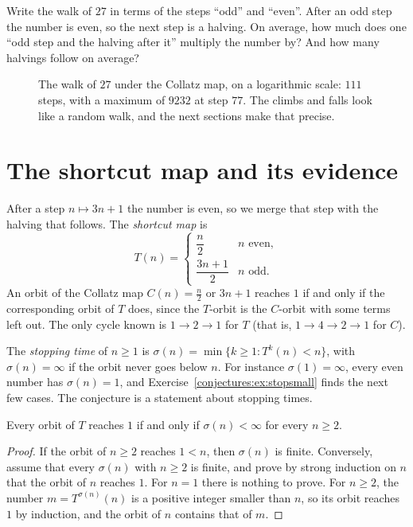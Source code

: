 \begin{think}
Write the walk of $27$ in terms of the steps ``odd'' and ``even''. After an odd step the number is even, so the next step is a halving. On average,
how much does one ``odd step and the halving after it'' multiply the number by? And how many halvings follow on average?
\end{think}

\begin{figure}[ht]
\centering
{}
\caption{The walk of $27$ under the Collatz map, on a logarithmic scale: $111$ steps, with a maximum of $9232$ at step $77$. The climbs and falls
look like a random walk, and the next sections make that precise.}
\label{conjectures:fig:traj27}
\end{figure}

\section{The shortcut map and its evidence}

After a step $n\mapsto3n+1$ the number is even, so we merge that step with the halving that follows. The \emph{shortcut map} is
\[
T(n)=\begin{cases}\dfrac n2&n\text{ even},\\[2mm]\dfrac{3n+1}2&n\text{ odd}.\end{cases}
\]
An orbit of the Collatz map $C(n)=\frac n2$ or $3n+1$ reaches $1$ if and only if the corresponding orbit of $T$ does, since the $T$-orbit is the
$C$-orbit with some terms left out. The only cycle known is $1\to2\to1$ for $T$ (that is, $1\to4\to2\to1$ for $C$).

The \emph{stopping time} of $n\ge1$ is $\sigma(n)=\min\{k\ge1:T^k(n)<n\}$, with $\sigma(n)=\infty$ if the orbit never goes below $n$. For instance
$\sigma(1)=\infty$, every even number has $\sigma(n)=1$, and Exercise~\ref{conjectures:ex:stopsmall} finds the next few cases. The conjecture is a statement about
stopping times.

\begin{proposition}\label{conjectures:prop:stopping}
Every orbit of $T$ reaches $1$ if and only if $\sigma(n)<\infty$ for every $n\ge2$.
\end{proposition}
\begin{proof}
If the orbit of $n\ge2$ reaches $1<n$, then $\sigma(n)$ is finite. Conversely, assume that every $\sigma(n)$ with $n\ge2$ is finite, and prove by strong
induction on $n$ that the orbit of $n$ reaches $1$. For $n=1$ there is nothing to prove. For $n\ge2$, the number $m=T^{\sigma(n)}(n)$ is a positive
integer smaller than $n$, so its orbit reaches $1$ by induction, and the orbit of $n$ contains that of $m$.
\end{proof}

